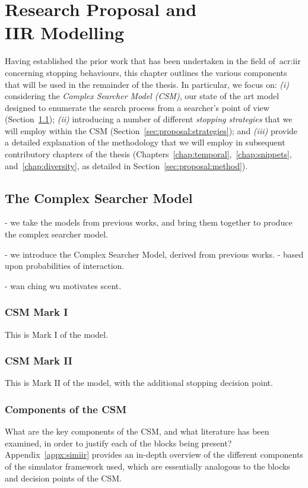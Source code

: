 
\chapter[Models and Proposal]{Research Proposal and\\IIR Modelling}\label{chap:proposal}
Having established the prior work that has been undertaken in the field of~\gls{acr:iir} concerning stopping behaviours, this chapter outlines the various components that will be used in the remainder of the thesis. In particular, we focus on: \emph{(i)} considering the \emph{Complex Searcher Model (CSM)}, our state of the art model designed to enumerate the search process from a searcher's point of view (Section~\ref{sec:proposal:csm}); \emph{(ii)} introducing a number of different \emph{stopping strategies} that we will employ within the CSM (Section~\ref{sec:proposal:strategies}); and \emph{(iii)} provide a detailed explanation of the methodology that we will employ in subsequent contributory chapters of the thesis (Chapters~\ref{chap:temporal},~\ref{chap:snippets}, and~\ref{chap:diversity}, as detailed in Section~\ref{sec:proposal:method}).

\section{The Complex Searcher Model}\label{sec:proposal:csm}

- we take the models from previous works, and bring them together to produce the complex searcher model.

- we introduce the Complex Searcher Model, derived from previous works.
- based upon probabilities of interaction.

- wan ching wu motivates scent.

\subsection{CSM Mark I}
This is Mark I of the model.

\subsection{CSM Mark II}
This is Mark II of the model, with the additional stopping decision point.

\subsection{Components of the CSM}
What are the key components of the CSM, and what literature has been examined, in order to justify each of the blocks being present? Appendix~\ref{appx:simiir} provides an in-depth overview of the different components of the simulator framework used, which are essentially analogous to the blocks and decision points of the CSM.

